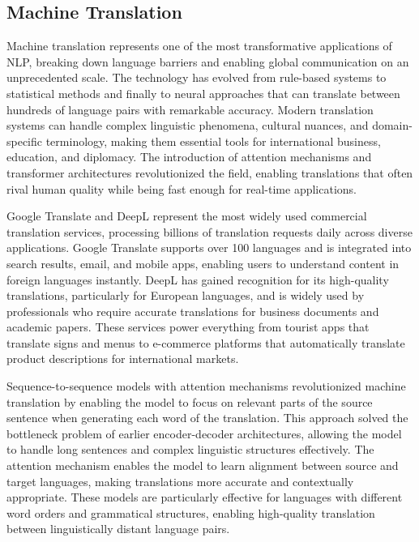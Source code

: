 \subsection{Machine Translation}

Machine translation represents one of the most transformative applications of NLP, breaking down language barriers and enabling global communication on an unprecedented scale. The technology has evolved from rule-based systems to statistical methods and finally to neural approaches that can translate between hundreds of language pairs with remarkable accuracy. Modern translation systems can handle complex linguistic phenomena, cultural nuances, and domain-specific terminology, making them essential tools for international business, education, and diplomacy. The introduction of attention mechanisms and transformer architectures revolutionized the field, enabling translations that often rival human quality while being fast enough for real-time applications.

Google Translate and DeepL represent the most widely used commercial translation services, processing billions of translation requests daily across diverse applications. Google Translate supports over 100 languages and is integrated into search results, email, and mobile apps, enabling users to understand content in foreign languages instantly. DeepL has gained recognition for its high-quality translations, particularly for European languages, and is widely used by professionals who require accurate translations for business documents and academic papers. These services power everything from tourist apps that translate signs and menus to e-commerce platforms that automatically translate product descriptions for international markets.

Sequence-to-sequence models with attention mechanisms revolutionized machine translation by enabling the model to focus on relevant parts of the source sentence when generating each word of the translation. This approach solved the bottleneck problem of earlier encoder-decoder architectures, allowing the model to handle long sentences and complex linguistic structures effectively. The attention mechanism enables the model to learn alignment between source and target languages, making translations more accurate and contextually appropriate. These models are particularly effective for languages with different word orders and grammatical structures, enabling high-quality translation between linguistically distant language pairs.


